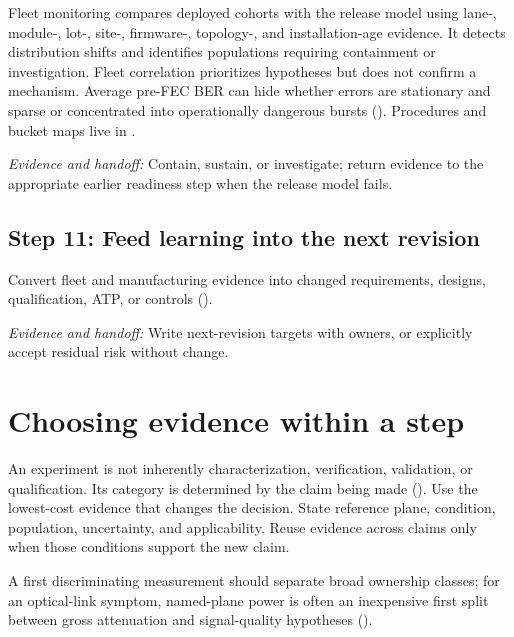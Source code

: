 Fleet monitoring compares deployed cohorts with the release model using lane-,
module-, lot-, site-, firmware-, topology-, and installation-age evidence. It
detects distribution shifts and identifies populations requiring containment or
investigation. Fleet correlation prioritizes hypotheses but does not confirm a
mechanism. Average pre-FEC BER can hide whether errors are stationary and sparse
or concentrated into operationally dangerous bursts
(). Procedures and bucket maps live
in .

\textit{Evidence and handoff:} Contain, sustain, or investigate; return evidence
to the appropriate earlier readiness step when the release model fails.

\subsection{Step 11: Feed learning into the next revision}
\label{sec:ladder-feedback}

Convert fleet and manufacturing evidence into changed requirements, designs,
qualification, ATP, or controls ().

\textit{Evidence and handoff:} Write next-revision targets with owners, or
explicitly accept residual risk without change.

\section{Choosing evidence within a step}
\label{sec:ladder-evidence-class}

An experiment is not inherently characterization, verification, validation, or
qualification. Its category is determined by the claim being made
(). Use the lowest-cost evidence that changes the
decision. State reference plane, condition, population, uncertainty, and
applicability. Reuse evidence across claims only when those conditions support
the new claim.

A first discriminating measurement should separate broad ownership classes; for
an optical-link symptom, named-plane power is often an inexpensive first split
between gross attenuation and signal-quality hypotheses
().



